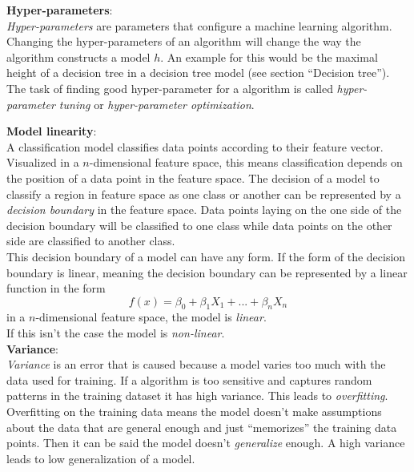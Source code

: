 \textbf{Hyper-parameters}: \\
\emph{Hyper-parameters} are parameters that configure a machine learning algorithm. Changing the hyper-parameters of an algorithm will change the way the algorithm constructs a model $h$. An example for this would be the maximal height of a decision tree in a decision tree model (see section ``Decision tree''). The task of finding good hyper-parameter for a algorithm is called \emph{hyper-parameter tuning} or \emph{hyper-parameter optimization}.

\textbf{Model linearity}: \\
A classification model classifies data points according to their feature vector. Visualized in a $n$-dimensional feature space, this means classification depends on the position of a data point in the feature space. The decision of a model to classify a region in feature space as one class or another can be represented by a \emph{decision boundary} in the feature space. Data points laying on the one side of the decision boundary will be classified to one class while data points on the other side are classified to another class.
\\

This decision boundary of a model can have any form. If the form of the decision boundary is linear, meaning the decision boundary can be represented by a linear function in the form 
\begin{equation} \label{eq:1}
f(x)=\beta_0 + \beta_1 X_1 + ... + \beta_n X_n
\end{equation}
in a $n$-dimensional feature space, the model is \emph{linear}.\\
If this isn't the case the model is \emph{non-linear}. \cite{James.2013}
\\

\textbf{Variance}: \\

\emph{Variance} is an error that is caused because a model varies too much with the data used for training. If a algorithm is too sensitive and captures random patterns in the training dataset it has high variance. This leads to \emph{overfitting}. Overfitting on the training data means the model doesn't make assumptions about the data that are general enough and just ``memorizes'' the training data points. Then it can be said the model doesn't \emph{generalize} enough. A high variance leads to low generalization of a model.

